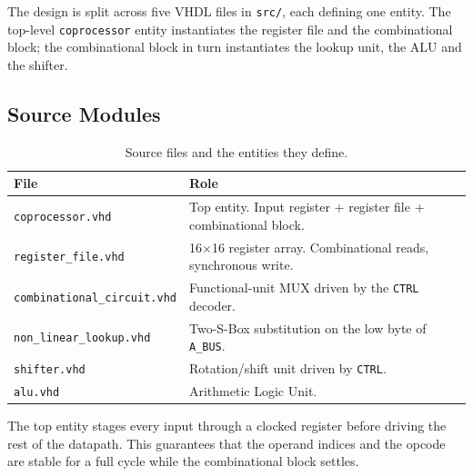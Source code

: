 \documentclass[11pt,a4paper]{article}
\begin{document}
The design is split across five VHDL files in \texttt{src/}, each
defining one entity. The top-level \texttt{coprocessor} entity
instantiates the register file and the combinational block; the
combinational block in turn instantiates the lookup unit, the ALU and
the shifter.

\subsection{Source Modules}

\begin{table}[H]
  \centering
  \caption{Source files and the entities they define.}
  \begin{tabularx}{\linewidth}{@{}l X@{}}
    \toprule
    \textbf{File} & \textbf{Role} \\
    \midrule
    \texttt{coprocessor.vhd}         & Top entity. Input register + register file + combinational block. \\
    \texttt{register\_file.vhd}      & 16$\times$16 register array. Combinational reads, synchronous write. \\
    \texttt{combinational\_circuit.vhd} & Functional-unit MUX driven by the \texttt{CTRL} decoder. \\
    \texttt{non\_linear\_lookup.vhd} & Two-S-Box substitution on the low byte of \texttt{A\_BUS}. \\
    \texttt{shifter.vhd}             & Rotation/shift unit driven by \texttt{CTRL}. \\
    \texttt{alu.vhd}                 & Arithmetic Logic Unit. \\
    \bottomrule
  \end{tabularx}
\end{table}

\noindent The top entity stages every input through a clocked register
before driving the rest of the datapath. This guarantees that the
operand indices and the opcode are stable for a full cycle while the
combinational block settles.
\end{document}
